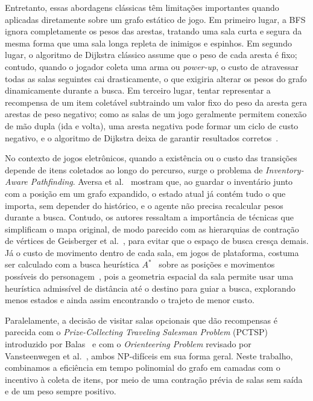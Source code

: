 \documentclass[conference]{IEEEtran}
\begin{document}
Entretanto, essas abordagens cl\'assicas t\^em limita\c{c}\~oes importantes quando aplicadas diretamente sobre um grafo est\'atico de jogo. Em primeiro lugar, a BFS ignora completamente os pesos das arestas, tratando uma sala curta e segura da mesma forma que uma sala longa repleta de inimigos e espinhos. Em segundo lugar, o algoritmo de Dijkstra cl\'assico assume que o peso de cada aresta \'e fixo; contudo, quando o jogador coleta uma arma ou \textit{power-up}, o custo de atravessar todas as salas seguintes cai drasticamente, o que exigiria alterar os pesos do grafo dinamicamente durante a busca. Em terceiro lugar, tentar representar a recompensa de um item colet\'avel subtraindo um valor fixo do peso da aresta gera arestas de peso negativo; como as salas de um jogo geralmente permitem conex\~ao de m\~ao dupla (ida e volta), uma aresta negativa pode formar um ciclo de custo negativo, e o algoritmo de Dijkstra deixa de garantir resultados corretos~\cite{cormen2022}.

No contexto de jogos eletr\^onicos, quando a exist\^encia ou o custo das transi\c{c}\~oes depende de itens coletados ao longo do percurso, surge o problema de \textit{Inventory-Aware Pathfinding}. Aversa et al.~\cite{aversa2016} mostram que, ao guardar o invent\'ario junto com a posi\c{c}\~ao em um grafo expandido, o estado atual j\'a cont\'em tudo o que importa, sem depender do hist\'orico, e o agente n\~ao precisa recalcular pesos durante a busca. Contudo, os autores ressaltam a import\^ancia de t\'ecnicas que simplificam o mapa original, de modo parecido com as hierarquias de contra\c{c}\~ao de v\'ertices de Geisberger et al.~\cite{geisberger2008}, para evitar que o espa\c{c}o de busca cres\c{c}a demais. J\'a o custo de movimento dentro de cada sala, em jogos de plataforma, costuma ser calculado com a busca heur\'istica $A^*$~\cite{hart1968} sobre as posi\c{c}\~oes e movimentos poss\'iveis do personagem~\cite{tremblay2014}, pois a geometria espacial da sala permite usar uma heur\'istica admiss\'ivel de dist\^ancia at\'e o destino para guiar a busca, explorando menos estados e ainda assim encontrando o trajeto de menor custo.

Paralelamente, a decis\~ao de visitar salas opcionais que d\~ao recompensas \'e parecida com o \textit{Prize-Collecting Traveling Salesman Problem} (PCTSP) introduzido por Balas~\cite{balas1989} e com o \textit{Orienteering Problem} revisado por Vansteenwegen et al.~\cite{vansteenwegen2011}, ambos NP-dif\'iceis em sua forma geral. Neste trabalho, combinamos a efici\^encia em tempo polinomial do grafo em camadas com o incentivo \`a coleta de itens, por meio de uma contra\c{c}\~ao pr\'evia de salas sem sa\'ida e de um peso sempre positivo.
\end{document}
